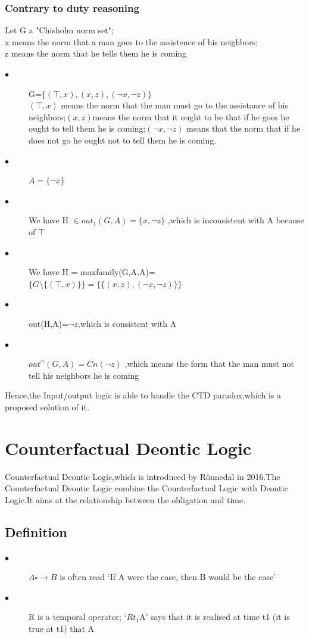 \documentclass{article}
\begin{document}
\subsubsection{Contrary to duty reasoning}
Let G a "Chisholm norm set";\\
x means the norm that a man goes to the assistence of his neighbors;\\
z means the norm that he tells them he is coming\\
\begin{description}
\item[$\bullet$]G=$\{(\top ,x),(x,z),(\neg x,\neg z)  \}$\\
 $(\top ,x)$ means the norm that the man must go to the assistance of his neighbors;$(x,z)$means the norm that it ought to be that if he goes he ought to tell them he is coming;$(\neg x,\neg z)$ means that the norm that if he does not go he ought not to tell them he is coming.
 \item[$\bullet$] $A=\{ \neg x \}$
 \item[$\bullet$] We have H $\in out_{1}(G,A)=\{x,\neg z\}$ ,which is inconsistent with A because of $\top$
 \item[$\bullet$] We have  H = maxfamily(G,A,A)=$ \{ G\setminus \{(\top,x) \}\}=\{\{(x,z),(\neg x,\neg z)   \}\} $
 \item[$\bullet$] out(H,A)=$\neg z$,which is consistent with A
 \item[$\bullet$]$out^{\cap}(G,A)=Cn(\neg z)$ ,which means the form that the man must not tell his neighbors he is coming
\end{description}
Hence,the Input/output logic is able to handle the CTD paradox,which is a proposed solution of it.
\section{Counterfactual Deontic Logic}
  Counterfactual Deontic Logic\cite{6},which is introduced by Rönnedal in 2016.The Counterfactual Deontic Logic combine the Counterfactual Logic with Deontic Logic.It aims at the relationship between the obligation and time.
\subsection{Definition}
\begin{description}
\item[$\bullet$]$A\square \rightarrow B$ is often read ‘If A were the case, then B would be the case’
\item[$\bullet$]R is a temporal operator; ‘$Rt_{1}$A’ says that it is realised at time t1 (it is true at t1) that A
\end{description}
\end{document}
